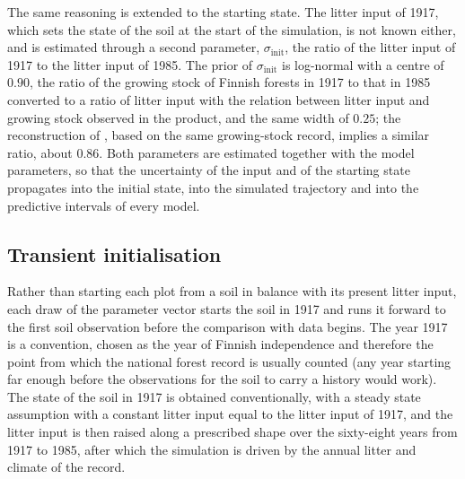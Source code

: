 \documentclass[11pt]{article}
\begin{document}
The same reasoning is extended to the starting state. The litter input of 1917, which
sets the state of the soil at the start of the simulation, is not known either, and is
estimated through a second parameter, $\sigma_{\mathrm{init}}$, the ratio of the litter
input of 1917 to the litter input of 1985. The prior of $\sigma_{\mathrm{init}}$ is
log-normal with a centre of $0.90$, the ratio of the growing stock of Finnish forests
in 1917 to that in 1985 \citep{Korhonen2024} converted to a ratio of litter input with
the relation between litter input and growing stock observed in the product, and the
same width of $0.25$; the reconstruction of \citet{Liski2006}, based on the same
growing-stock record, implies a similar ratio, about $0.86$. Both parameters are estimated together
with the model parameters, so that the uncertainty of the input and of the starting
state propagates into the initial state, into the simulated trajectory and into the
predictive intervals of every model.

\subsection{Transient initialisation}\label{sec:init}

Rather than starting each plot from a soil in balance with its present litter input,
each draw of the parameter vector starts the soil in 1917 and runs it forward to the
first soil observation before the comparison with data begins. The year 1917 is a
convention, chosen as the year of Finnish independence and therefore the
point from which the national forest record is usually counted (any year starting far enough before the observations for the
soil to carry a history would work). 
The state of the soil in 1917 is obtained conventionally, with a steady state assumption with a constant litter input equal to the litter input of
1917, and the litter input is then raised along a prescribed shape over the sixty-eight
years from 1917 to 1985, after which the simulation is driven by the annual litter and
climate of the record.
\end{document}
